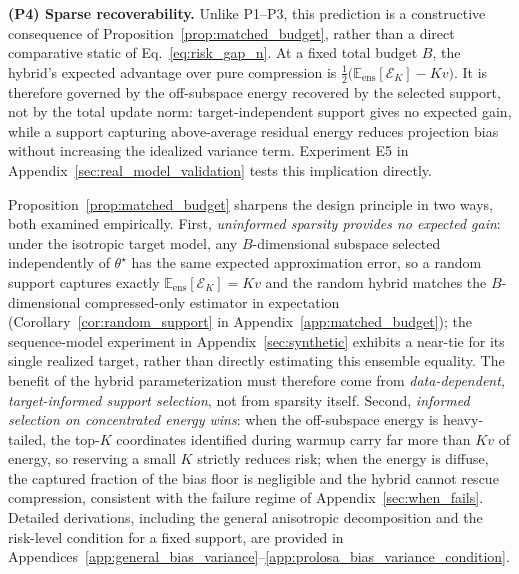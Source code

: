 \textbf{(P4) Sparse recoverability.}
Unlike P1--P3, this prediction is a constructive consequence of Proposition~\ref{prop:matched_budget}, rather than a direct comparative static of Eq.~\eqref{eq:risk_gap_n}.
At a fixed total budget $B$, the hybrid's expected advantage over pure compression is
$\frac{1}{2}\big(\mathbb E_{\mathrm{ens}}[\mathcal E_K]-Kv\big)$.
It is therefore governed by the off-subspace energy recovered by the selected support, not by the total update norm: target-independent support gives no expected gain, while a support capturing above-average residual energy reduces projection bias without increasing the idealized variance term.
Experiment E5 in Appendix~\ref{sec:real_model_validation} tests this implication directly.

Proposition~\ref{prop:matched_budget} sharpens the design principle in two ways, both examined empirically.
First, \emph{uninformed sparsity provides no expected gain}: under the isotropic target model, any $B$-dimensional subspace selected independently of $\theta^\star$ has the same expected approximation error, so a random support captures exactly $\mathbb E_{\mathrm{ens}}[\mathcal{E}_K]=Kv$ and the random hybrid matches the $B$-dimensional compressed-only estimator in expectation (Corollary~\ref{cor:random_support} in Appendix~\ref{app:matched_budget}); the sequence-model experiment in Appendix~\ref{sec:synthetic} exhibits a near-tie for its single realized target, rather than directly estimating this ensemble equality.
The benefit of the hybrid parameterization must therefore come from \emph{data-dependent, target-informed support selection}, not from sparsity itself.
Second, \emph{informed selection on concentrated energy wins}: when the off-subspace energy is heavy-tailed, the top-$K$ coordinates identified during warmup carry far more than $Kv$ of energy, so reserving a small $K$ strictly reduces risk; when the energy is diffuse, the captured fraction of the bias floor is negligible and the hybrid cannot rescue compression, consistent with the failure regime of Appendix~\ref{sec:when_fails}.
Detailed derivations, including the general anisotropic decomposition and the risk-level condition for a fixed support, are provided in Appendices~\ref{app:general_bias_variance}--\ref{app:prolosa_bias_variance_condition}.


